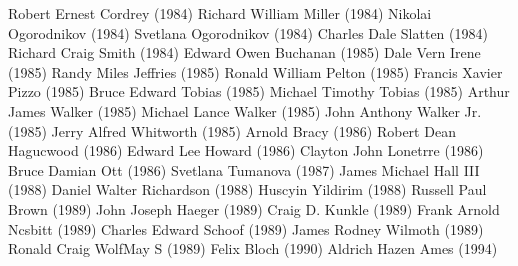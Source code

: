 \documentclass{memoir}
\begin{document}
\begin{refsegment}
\begin{multicols}{2}
Robert Ernest Cordrey (1984)\newline
Richard William Miller (1984)\newline
Nikolai Ogorodnikov (1984)\newline
Svetlana Ogorodnikov (1984)\newline
Charles Dale Slatten (1984)\newline
Richard Craig Smith (1984)\newline
Edward Owen Buchanan (1985)\newline
Dale Vern Irene (1985)\newline
Randy Miles Jeffries (1985)\newline
Ronald William Pelton (1985)\newline
Francis Xavier Pizzo (1985)\newline
Bruce Edward Tobias (1985)\newline
Michael Timothy Tobias (1985)\newline
Arthur James Walker (1985)\newline
Michael Lance Walker (1985)\newline
John Anthony Walker Jr. (1985)\newline
Jerry Alfred Whitworth (1985)\newline
Arnold Bracy (1986)\newline
Robert Dean Hagucwood (1986)\newline
Edward Lee Howard (1986)\newline
Clayton John Lonetrre (1986)\newline
Bruce Damian Ott (1986)\newline
Svetlana Tumanova (1987)\newline
James Michael Hall III (1988)\newline
Daniel Walter Richardson (1988)\newline
Huscyin Yildirim (1988)\newline
Russell Paul Brown (1989)\newline
John Joseph Haeger (1989)\newline
Craig D. Kunkle (1989)\newline
Frank Arnold Ncsbitt (1989)\newline
Charles Edward Schoof (1989)\newline
James Rodney Wilmoth (1989)\newline
Ronald Craig WolfMay S (1989)\newline
Felix Bloch (1990)\newline
Aldrich Hazen Ames (1994)\newline

\end{multicols}
\end{refsegment}
\end{document}
